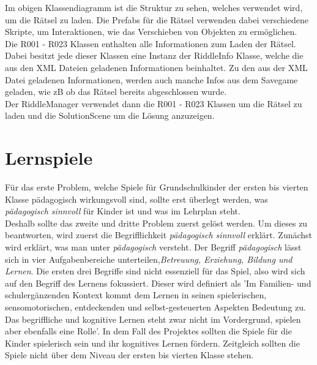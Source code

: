
Im obigen Klassendiagramm ist die Struktur zu sehen, welches verwendet wird, um die Rätsel zu laden. Die Prefabs für die Rätsel verwenden dabei verschiedene Skripte, um Interaktionen, wie das Verschieben von Objekten zu ermöglichen.\\
Die R001 - R023 Klassen enthalten alle Informationen zum Laden der Rätsel. Dabei besitzt jede dieser Klassen eine Instanz der RiddleInfo Klasse, welche die aus den XML Dateien geladenen Informationen beinhaltet. Zu den aus der XML Datei geladenen Informationen, werden auch manche Infos aus dem Savegame geladen, wie zB ob das Rätsel bereits abgeschlossen wurde.\\
Der RiddleManager verwendet dann die R001 - R023 Klassen um die Rätsel zu laden und die SolutionScene um die Lösung anzuzeigen.

\section{Lernspiele}
Für das erste Problem, welche Spiele für Grundschulkinder der ersten bis vierten Klasse pädagogisch wirkungsvoll sind, sollte erst überlegt werden, was \textit{pädagogisch sinnvoll} für Kinder ist und was im Lehrplan steht.\\
Deshalb sollte das zweite und dritte Problem zuerst gelöst werden. Um dieses zu beantworten, wird zuerst die Begrifflichkeit \textit{pädagogisch sinnvoll} erklärt.  Zunächst wird erklärt, was man unter \textit{pädagogisch} versteht. Der Begriff \textit{pädagogisch} lässt sich in vier Aufgabenbereiche unterteilen,\textit{Betreuung, Erziehung, Bildung und Lernen}. Die ersten drei Begriffe sind nicht essenziell für das Spiel, also wird sich auf den Begriff des Lernens fokussiert. Dieser wird definiert als 'Im Familien- und schulergänzenden Kontext kommt dem Lernen in seinen spielerischen, sensomotorischen, entdeckenden und selbst-gesteuerten Aspekten Bedeutung zu. Das begriffliche und kognitive Lernen steht zwar nicht im Vordergrund, spielen aber ebenfalls eine Rolle'\autocite{PädaLog}. %
In dem Fall des Projektes sollten die Spiele für die Kinder spielerisch sein und ihr kognitives Lernen fördern. Zeitgleich sollten die Spiele nicht über dem Niveau der ersten bis vierten Klasse stehen.\\

